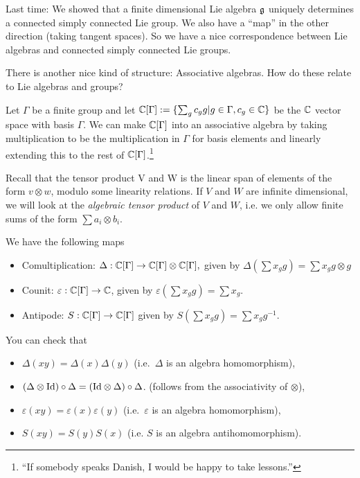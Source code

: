  \setcounter{lecture}{6}
  

 Last time: We showed that a finite dimensional Lie algebra $\mathfrak{g}$ uniquely determines a
 connected simply connected Lie group. We also have a ``map'' in the other direction
 (taking tangent spaces). So we have a nice correspondence between Lie algebras and
 connected simply connected Lie groups.

 There is another nice kind of structure: Associative algebras. How do these relate to
 Lie algebras and groups?

 Let $\Gamma$ be a finite group and let $\mathbb{C}[\Gamma]:=\{\sum_{g} c_gg|g\in \Gamma,
 c_g\in\mathbb{C}\}$ be the $\mathbb{C}$ vector space with basis $\Gamma$. We can make $\mathbb{C}[\Gamma]$
 into an associative algebra by taking multiplication to be the multiplication in
 $\Gamma$ for basis elements and linearly extending this to the rest of
 $\mathbb{C}[\Gamma]$.\footnote{``If somebody speaks Danish, I would be happy
 to take lessons.''}

 \begin{remark}Recall that the tensor product V and W is the linear span of elements
 of the form $v\otimes w$, modulo some linearity relations. If $V$ and $W$ are
 infinite dimensional, we will look at the \emph{algebraic tensor product} of $V$ and
 $W$, i.e. we only allow finite sums of the form $\sum a_i\otimes b_i$.
 \end{remark}

 We have the following maps
 \begin{itemize}
 \item[] Comultiplication: $\Delta:\mathbb{C}[\Gamma]\to
  \mathbb{C}[\Gamma]\otimes \mathbb{C}[\Gamma],$ given by $\Delta(\sum x_g
  g)=\sum x_gg\otimes g$
 \item[] Counit:  $\varepsilon:\mathbb{C}[\Gamma]\to \mathbb{C}$, given by $\varepsilon(\sum x_g
  g)=\sum x_g$.
 \item[] Antipode: $S:\mathbb{C}[\Gamma]\to \mathbb{C}[\Gamma]$ given by $S(\sum x_g
  g)=\sum x_gg^{-1}$.
 \end{itemize}

 You can check that
 \begin{itemize}
 \item $\Delta(xy)=\Delta(x)\Delta(y)$ (i.e.\ $\Delta$ is an algebra homomorphism),

 \item $(\Delta\otimes\mathrm{Id})\circ \Delta = (\mathrm{Id}\otimes\Delta)\circ \Delta$. (follows
 from the associativity of $\otimes$),

 \item $\varepsilon(xy)=\varepsilon(x)\varepsilon(y)$ (i.e.\ $\varepsilon$ is an
 algebra homomorphism),

 \item $S(xy)=S(y)S(x)$ (i.e. $S$ is an algebra antihomomorphism).
 \end{itemize}

